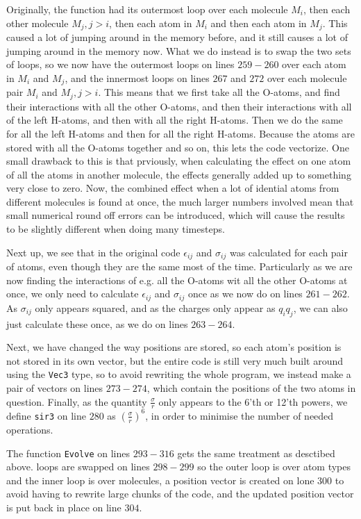 \documentclass{article}
\begin{document}
Originally, the function had its outermost loop over each molecule $M_i$, then each other molecule $M_j,j>i$, then each atom in $M_i$ and then each atom in $M_j$. This caused a lot of jumping around in the memory before, and it still causes a lot of jumping around in the memory now. What we do instead is to swap the two sets of loops, so we now have the outermost loops on lines $259-260$ over each atom in $M_i$ and $M_j$, and the innermost loops on lines $267$ and $272$ over each molecule pair $M_i$ and $M_j,j>i$. This means that we first take all the O-atoms, and find their interactions with all the other O-atoms, and then their interactions with all of the left H-atoms, and then with all the right H-atoms. Then we do the same for all the left H-atoms and then for all the right H-atoms. Because the atoms are stored with all the O-atoms together and so on, this lets the code vectorize. One small drawback to this is that prviously, when calculating the effect on one atom of all the atoms in another molecule, the effects generally added up to something very close to zero. Now, the combined effect when a lot of idential atoms from different molecules is found at once, the much larger numbers involved mean that small numerical round off errors can be introduced, which will cause the results to be slightly different when doing many timesteps.

Next up, we see that in the original code $\epsilon_{ij}$ and $\sigma_{ij}$ was calculated for each pair of atoms, even though they are the same most of the time. Particularly as we are now finding the interactions of e.g. all the O-atoms wit all the other O-atoms at once, we only need to calculate $\epsilon_{ij}$ and $\sigma_{ij}$ once as we now do on lines $261-262$. As $\sigma_{ij}$ only appears squared, and as the charges only appear as $q_iq_j$, we can also just calculate these once, as we do on lines $263-264$.

Next, we have changed the way positions are stored, so each atom's position is not stored in its own vector, but the entire code is still very much built around using the \texttt{Vec3} type, so to avoid rewriting the whole program, we instead make a pair of vectors on lines $273-274$, which contain the positions of the two atoms in question. Finally, as the quantity $\frac{\sigma}{r}$ only appears to the 6'th or 12'th powers, we define \texttt{sir3} on line $280$ as $\left(\frac{\sigma}{r}\right)^6$, in order to minimise the number of needed operations.

The function \texttt{Evolve} on lines $293-316$ gets the same treatment as desctibed above. loops are swapped on lines $298-299$ so the outer loop is over atom types and the inner loop is over molecules, a position vector is created on lone $300$ to avoid having to rewrite large chunks of the code, and the updated position vector is put back in place on line $304$.
\end{document}
